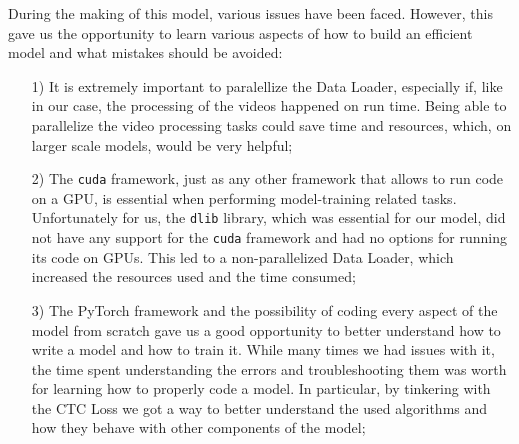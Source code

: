 \documentclass[11pt,journal]{IEEEtran}
\begin{document}
During the making of this model, various issues have been faced. However, this gave us the opportunity to learn various aspects of how to build an efficient model and what mistakes should be avoided: 
\begin{itemize}
    \item [1)] It is extremely important to paralellize the Data Loader, especially if, like in our case, the processing of the videos happened on run time. Being able to parallelize the video processing tasks could save time and resources, which, on larger scale models, would be very helpful;
    \item [2)] The \texttt{cuda} framework, just as any other framework that allows to run code on a GPU, is essential when performing model-training related tasks. Unfortunately for us, the \texttt{dlib} library, which was essential for our model, did not have any support for the \texttt{cuda} framework and had no options for running its code on GPUs. This led to a non-parallelized Data Loader, which increased the resources used and the time consumed;
    \item [3)] The PyTorch framework and the possibility of coding every aspect of the model from scratch gave us a good opportunity to better understand how to write a model and how to train it. While many times we had issues with it, the time spent understanding the errors and troubleshooting them was worth for learning how to properly code a model. In particular, by tinkering with the CTC Loss we got a way to better understand the used algorithms and how they behave with other components of the model;
\end{itemize}



\end{document}
